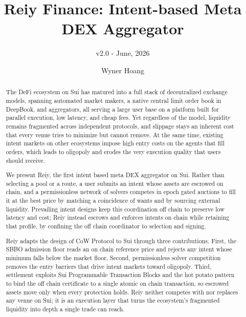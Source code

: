 \documentclass[10pt,sigconf,nonacm]{acmart}
\theoremstyle{reiythm}
\begin{document}
\title{Reiy Finance: Intent-based Meta DEX Aggregator}
\subtitle{v2.0 - June, 2026}

\author{Wyner Hoang}

\renewcommand{\shortauthors}{Wyner Hoang et al.}

\begin{abstract}
The DeFi ecosystem on Sui has matured into a full stack of decentralized
exchange models, spanning automated market makers, a native central limit
order book in DeepBook, and aggregators, all serving a large user base on a
platform built for parallel execution, low latency, and cheap fees. Yet
regardless of the model, liquidity remains fragmented across independent
protocols, and slippage stays an inherent cost that every venue tries to
minimize but cannot remove. At the same time, existing intent markets on other
ecosystems impose high entry costs on the agents that fill orders, which leads
to oligopoly and erodes the very execution quality that users should receive.

We present Reiy, the first intent based meta DEX aggregator on Sui. Rather than
selecting a pool or a route, a user submits an intent whose assets are escrowed
on chain, and a permissionless network of solvers competes in epoch gated
auctions to fill it at the best price by matching a coincidence of wants and by
sourcing external liquidity. Prevailing intent designs keep this coordination off
chain to preserve low latency and cost; Reiy instead escrows and enforces intents
on chain while retaining that profile, by confining the off chain coordinator to
selection and signing.

Reiy adapts the design of CoW Protocol to Sui through three contributions. First,
the SBBO admission floor reads an on chain reference price and rejects any intent
whose minimum falls below the market floor. Second, permissionless solver
competition removes the entry barriers that drive intent markets toward
oligopoly. Third, settlement exploits Sui Programmable Transaction Blocks and the
hot potato pattern to bind the off chain certificate to a single atomic on chain
transaction, so escrowed assets move only when every protection holds. Reiy
neither competes with nor replaces any venue on Sui; it is an execution layer that
turns the ecosystem's fragmented liquidity into depth a single trade can reach.
\end{abstract}
\end{document}
